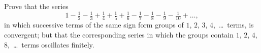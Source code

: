 Prove that the series
\[
1 - \tfrac{1}{2} - \tfrac{1}{3} + \tfrac{1}{4} + \tfrac{1}{5} + \tfrac{1}{6}
  - \tfrac{1}{7} - \tfrac{1}{8} - \tfrac{1}{9} - \tfrac{1}{10} + \dots,
\]
in which successive terms of the same sign form groups of $1$, $2$, $3$, $4$,~\dots\ terms,
is convergent; but that the corresponding series in which the groups contain
$1$, $2$, $4$, $8$,~\dots\ terms oscillates finitely. 

